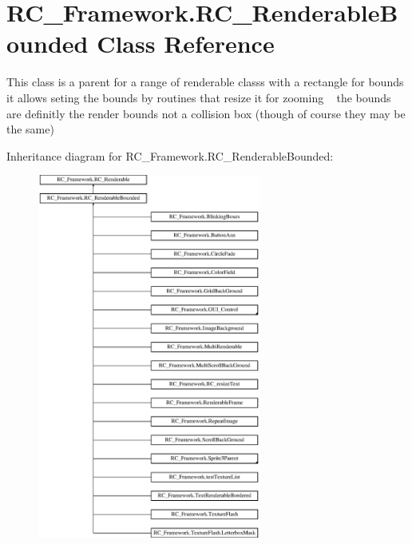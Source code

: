 \hypertarget{class_r_c___framework_1_1_r_c___renderable_bounded}{}\section{R\+C\+\_\+\+Framework.\+R\+C\+\_\+\+Renderable\+Bounded Class Reference}
\label{class_r_c___framework_1_1_r_c___renderable_bounded}


This class is a parent for a range of renderable class\textquotesingle{}s with a rectangle for bounds it allows seting the bounds by routines that resize it for zooming ~\newline
the bounds are definitly the render bounds not a collision box (though of course they may be the same)  


Inheritance diagram for R\+C\+\_\+\+Framework.\+R\+C\+\_\+\+Renderable\+Bounded\+:\begin{figure}[H]
\begin{center}
\leavevmode
\includegraphics[height=12.000000cm]{class_r_c___framework_1_1_r_c___renderable_bounded}
\end{center}
\end{figure}
